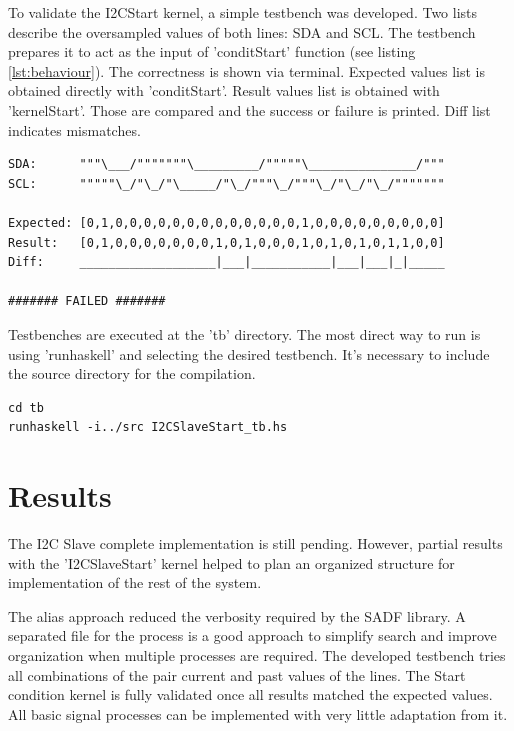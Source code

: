 \documentclass{article}
\begin{document}
To validate the I2CStart kernel, a simple testbench was developed. Two lists describe the oversampled values of both lines: SDA and SCL. The testbench prepares it to act as the input of 'conditStart' function (see listing \ref{lst:behaviour}).
The correctness is shown via terminal. Expected values list is obtained directly with 'conditStart'. Result values list is obtained with 'kernelStart'. Those are compared and the success or failure is printed. Diff list indicates mismatches.

\begin{lstlisting}[frame=single, basicstyle=\small, caption={I2CSlaveStart\_tb failure screen example}, captionpos=b]
SDA:      """\___/"""""""\_________/"""""\_______________/"""
SCL:      """""\_/"\_/"\_____/"\_/"""\_/"""\_/"\_/"\_/"""""""

Expected: [0,1,0,0,0,0,0,0,0,0,0,0,0,0,0,1,0,0,0,0,0,0,0,0,0]
Result:   [0,1,0,0,0,0,0,0,0,1,0,1,0,0,0,1,0,1,0,1,0,1,1,0,0]
Diff:     ___________________|___|___________|___|___|_|_____

####### FAILED #######
\end{lstlisting}

Testbenches are executed at the 'tb' directory. The most direct way to run is using 'runhaskell' and selecting the desired testbench. It's necessary to include the source directory for the compilation.

\begin{lstlisting}[frame=single, basicstyle=\small, caption={How to run testbench}, captionpos=b]
cd tb
runhaskell -i../src I2CSlaveStart_tb.hs
\end{lstlisting}


\section{Results} \label{sec:resul}
The I2C Slave complete implementation is still pending. However, partial results with the 'I2CSlaveStart' kernel helped to plan an organized structure for implementation of the rest of the system. 

The alias approach reduced the verbosity required by the SADF library. A separated file for the process is a good approach to simplify search and improve organization when multiple processes are required.
The developed testbench tries all combinations of the pair current and past values of the lines. The Start condition kernel is fully validated once all results matched the expected values. All basic signal processes can be implemented with very little adaptation from it.
\end{document}
